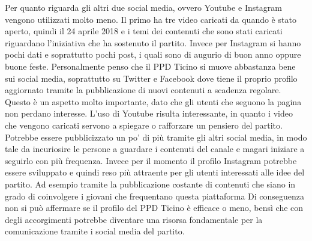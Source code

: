 Per quanto riguarda gli altri due social media, ovvero Youtube e Instagram vengono utilizzati molto meno. Il primo ha tre video caricati da quando è stato aperto, quindi il 24 aprile 2018  e i temi dei contenuti che sono stati caricati riguardano l’iniziativa che ha sostenuto il partito. Invece per Instagram si hanno pochi dati e soprattutto pochi post, i quali sono di augurio di buon anno oppure buone feste.
Personalmente penso che il PPD Ticino si muove abbastanza bene sui social media, soprattutto su Twitter e Facebook dove tiene il proprio profilo aggiornato tramite la pubblicazione di nuovi contenuti a scadenza regolare. Questo è un aspetto molto importante, dato che gli utenti che seguono la pagina non perdano interesse.  L’uso di Youtube risulta interessante, in quanto i video che vengono caricati servono a spiegare o rafforzare un pensiero del partito. Potrebbe essere pubblicizzato un po’ di più tramite gli altri social media, in modo tale da incuriosire le persone a guardare i contenuti del canale e magari iniziare a seguirlo con più frequenza. Invece per il momento il profilo Instagram potrebbe essere sviluppato e quindi reso più attraente per gli utenti interessati alle idee del partito. Ad esempio tramite la pubblicazione costante di contenuti che siano in grado di coinvolgere i giovani che frequentano questa piattaforma Di conseguenza non si può affermare se il profilo del PPD Ticino è efficace o meno, bensì che con degli accorgimenti potrebbe diventare una risorsa fondamentale per la comunicazione tramite i social media del partito.

